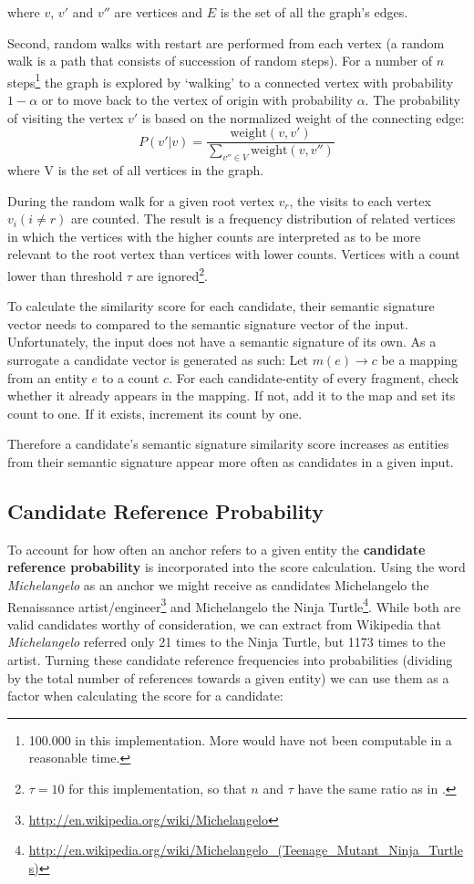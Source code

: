 \documentclass[runningheads,a4paper]{llncs}
\begin{document}
{where $v$, $v'$ and $v''$ are vertices and $E$ is the set of all the graph's edges.

Second, random walks with restart are performed from each vertex (a random walk is a path that consists of succession of random steps). For a number of $n$ steps\footnote{100.000 in this implementation. More would have not been computable in a reasonable time.} the graph is explored by `walking' to a connected vertex with probability $1 - \alpha$ or to move back to the vertex of origin with probability $\alpha$. The probability of visiting the vertex $v'$ is based on the normalized weight of the connecting edge:
$$P(v'|v) = \frac{\mathrm{weight}(v, v')}{\sum\limits_{v''\in V} \mathrm{weight}(v, v'')}$$
where V is the set of all vertices in the graph.

During the random walk for a given root vertex $v_r$, the visits to each vertex $v_i (i \neq r)$ are counted. The result is a frequency distribution of related vertices in which the vertices with the higher counts are interpreted as to be more relevant to the root vertex than vertices with lower counts. Vertices with a count lower than threshold $\tau$ are ignored\footnote{$\tau = 10$ for this implementation, so that $n$ and $\tau$ have the same ratio as in \cite{Babelfy}.}.

To calculate the similarity score for each candidate, their semantic signature vector needs to compared to the semantic signature vector of the input. Unfortunately, the input does not have a semantic signature of its own. As a surrogate a candidate vector is generated as such: Let $m(e) \rightarrow c$ be a mapping from an entity $e$ to a count $c$. For each candidate-entity of every fragment, check whether it already appears in the mapping. If not, add it to the map and set its count to one. If it exists, increment its count by one.

Therefore a candidate's semantic signature similarity score increases as entities from their semantic signature appear more often as candidates in a given input.

\subsection{Candidate Reference Probability}
To account for how often an anchor refers to a given entity the \textbf{candidate reference probability} is incorporated into the score calculation. Using the word \textit{Michelangelo} as an anchor we might receive as candidates Michelangelo the Renaissance artist/engineer\footnote{\url{http://en.wikipedia.org/wiki/Michelangelo}} and Michelangelo the Ninja Turtle\footnote{\url{http://en.wikipedia.org/wiki/Michelangelo_(Teenage_Mutant_Ninja_Turtles)}}. While both are valid candidates worthy of consideration, we can extract from Wikipedia that \textit{Michelangelo} referred only 21 times to the Ninja Turtle, but 1173 times to the artist. Turning these candidate reference frequencies into probabilities (dividing by the total number of references towards a given entity) we can use them as a factor when calculating the score for a candidate:

}
\end{document}
